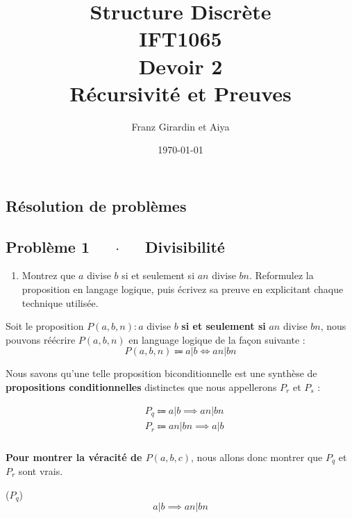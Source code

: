 \documentclass[16pt]{report}
\title{\Huge{Structure Discrète}\\{IFT1065}\\{\textbf{Devoir 2}} \\ {Récursivité et Preuves}}
\author{\huge{Franz Girardin et Aiya}}
\date{\today}
\begin{document}
\maketitle
\pagebreak
\tableofcontents 
\pagebreak

\pagebreak
\begin{multicols*}{2}
\newcommand\scalemath[2]{\scalebox{#1}{\mbox{\ensuremath{\displaystyle #2}}}}

    \chapter{Résolution de problèmes}

    \section*{Problème 1 $\quad$ $\cdot$  $\quad$ Divisibilité}
    \begin{enumerate}
        \item Montrez que $a$ divise $b$ si et seulement si $an$ divise $bn$. Reformulez la proposition
        en langage logique, puis écrivez sa preuve en explicitant chaque technique utilisée.
    \end{enumerate}

    Soit le proposition $P(a, b, n) : a $ divise $b$ \textbf{si et seulement si} $an$ divise $bn$, 
    nous pouvons réécrire $P(a, b, n)$ en language logique de la façon suivante :
    \[ P(a,b,n) \Coloneqq a|b \Leftrightarrow  an|bn \]

    Nous savons qu'une telle proposition biconditionnelle est une synthèse de \textbf{propositions conditionnelles}
    distinctes que nous appellerons $P_r$ et $P_s$ :

    \begin{align}
              &P_q \Coloneqq a|b \implies  an|bn \\ 
              &P_r \Coloneqq an|bn \implies a|b
    \end{align}     
    \paragraph{}
    \textbf{Pour montrer la véracité de $P(a,b,c)$}, nous allons donc montrer que $P_q$ et $P_r$ sont vrais. 
    
    \begin{prop}{($P_q$)}{}
        \[ a|b \implies  an|bn \]
    \end{prop}
    

\end{multicols*}
\end{document}
